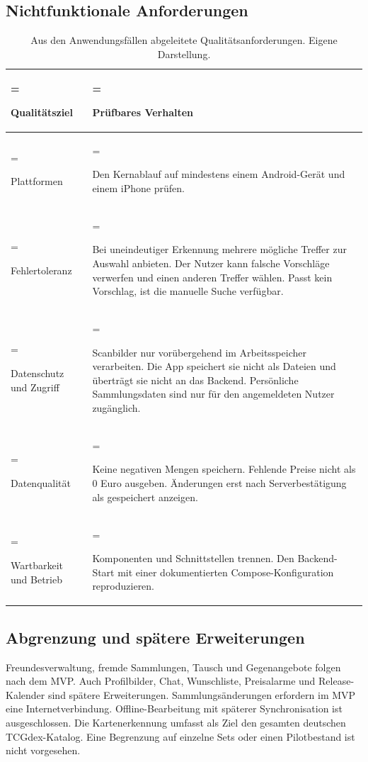\subsection{Nichtfunktionale Anforderungen}
\begin{table}[H]
\centering
\small
\begin{tabularx}{\linewidth}{@{}>{\hsize=0.56\hsize\linewidth=\hsize\raggedright\arraybackslash}X >{\hsize=1.44\hsize\linewidth=\hsize\raggedright\arraybackslash}X@{}}
\toprule
\textbf{Qualitätsziel} & \textbf{Prüfbares Verhalten} \\
\midrule
Plattformen & Den Kernablauf auf mindestens einem Android-Gerät und einem iPhone prüfen. \\
Fehlertoleranz & Bei uneindeutiger Erkennung mehrere mögliche Treffer zur Auswahl anbieten. Der Nutzer kann falsche Vorschläge verwerfen und einen anderen Treffer wählen. Passt kein Vorschlag, ist die manuelle Suche verfügbar. \\
Datenschutz und Zugriff & Scanbilder nur vorübergehend im Arbeitsspeicher verarbeiten. Die App speichert sie nicht als Dateien und überträgt sie nicht an das Backend. Persönliche Sammlungsdaten sind nur für den angemeldeten Nutzer zugänglich. \\
Datenqualität & Keine negativen Mengen speichern. Fehlende Preise nicht als 0 Euro ausgeben. Änderungen erst nach Serverbestätigung als gespeichert anzeigen. \\
Wartbarkeit und Betrieb & Komponenten und Schnittstellen trennen. Den Backend-Start mit einer dokumentierten Compose-Konfiguration reproduzieren. \\
\bottomrule
\end{tabularx}
\caption{Aus den Anwendungsfällen abgeleitete Qualitätsanforderungen. Eigene Darstellung.}
\end{table}
\subsection{Abgrenzung und spätere Erweiterungen}
Freundesverwaltung, fremde Sammlungen, Tausch und Gegenangebote folgen nach dem MVP. Auch Profilbilder, Chat, Wunschliste, Preisalarme und Release-Kalender sind spätere Erweiterungen. Sammlungsänderungen erfordern im MVP eine Internetverbindung. Offline-Bearbeitung mit späterer Synchronisation ist ausgeschlossen. Die Kartenerkennung umfasst als Ziel den gesamten deutschen TCGdex-Katalog. Eine Begrenzung auf einzelne Sets oder einen Pilotbestand ist nicht vorgesehen.

